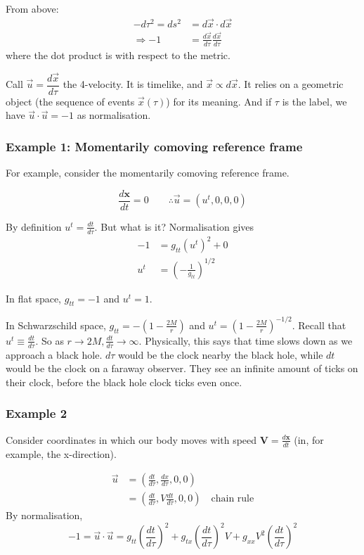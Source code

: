 \documentclass[a4paper]{article} %
\newcommand{\vect}[1]{\mathbf{#1}} %
\begin{document}
From above:
\begin{align*}
-d\tau^2=ds^2&=d\vec{x}\cdot d\vec{x}\\
\Rightarrow -1&=\frac{d\vec{x}}{d\tau}\frac{d\vec{x}}{d\tau}
\end{align*}
where the dot product is with respect to the metric. 

Call $\vec{u}=\dfrac{d\vec{x}}{d\tau}$ the 4-velocity. It is timelike, and $\vec{x}\propto d\vec{x}$. It relies on a geometric object (the sequence of events $\vec{x}(\tau)$) for its meaning. And if $\tau$ is the label, we have $\vec{u}\cdot \vec{u}=-1$ as normalisation.

\subsubsection{Example 1: Momentarily comoving reference frame}
For example, consider the momentarily comoving reference frame.

\begin{equation}
\frac{d\mathbf{x}}{dt}=0 \qquad \therefore \vec{u}=(u^t,0,0,0)
\end{equation}

By definition $u^t=\frac{dt}{d\tau}$. But what is it? Normalisation gives
\begin{align*}
-1&=g_{tt}(u^t)^2+0\\
u^t&=\left(-\frac{1}{g_{tt}}\right)^{1/2}
\end{align*}

In flat space, $g_{tt}=-1$ and $u^t=1$.

In Schwarzschild space, $g_{tt}=-\left(1-\frac{2M}{r}\right)$ and $u^t=\left(1-\frac{2M}{r}\right)^{-1/2}$. Recall that $u^t \equiv \frac{dt}{d\tau}$. So as $r\to 2M, \frac{dt}{d\tau}\to \infty$. Physically, this says that time slows down as we approach a black hole. $d\tau$ would be the clock nearby the black hole, while $dt$ would be the clock on a faraway observer. They see an infinite amount of ticks on their clock, before the black hole clock ticks even once.

\subsubsection{Example 2}
Consider coordinates in which our body moves with speed $\vect{V}=\frac{d\vect{x}}{dt}$ (in, for example, the x-direction).

\begin{align*}
\vec{u}&=\left(\frac{dt}{d\tau},\frac{dx}{d\tau},0,0 \right)\\
&=\left(\frac{dt}{d\tau}, V\frac{dt}{d\tau},0,0\right) \quad \text{chain rule}
\end{align*}
By normalisation,
\begin{equation}
-1=\vec{u}\cdot\vec{u}=g_{tt}\left(\frac{dt}{d\tau}\right)^2+g_{tx}\left(\frac{dt}{d\tau}\right)^2 V+g_{xx}V^2\left(\frac{dt}{d\tau}\right)^2
\end{equation}
\end{document}
